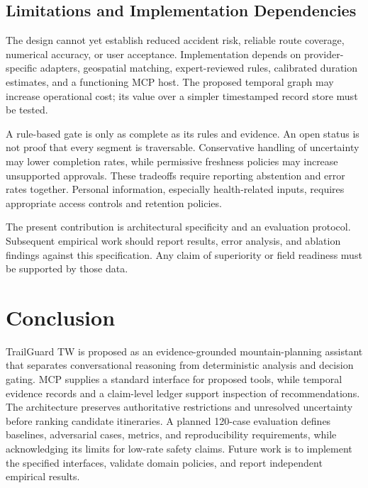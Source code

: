\documentclass[conference]{IEEEtran}
\begin{document}
\subsection{Limitations and Implementation Dependencies}
The design cannot yet establish reduced accident risk, reliable route coverage, numerical accuracy, or user acceptance. Implementation depends on provider-specific adapters, geospatial matching, expert-reviewed rules, calibrated duration estimates, and a functioning MCP host. The proposed temporal graph may increase operational cost; its value over a simpler timestamped record store must be tested.

A rule-based gate is only as complete as its rules and evidence. An open status is not proof that every segment is traversable. Conservative handling of uncertainty may lower completion rates, while permissive freshness policies may increase unsupported approvals. These tradeoffs require reporting abstention and error rates together. Personal information, especially health-related inputs, requires appropriate access controls and retention policies.

The present contribution is architectural specificity and an evaluation protocol. Subsequent empirical work should report results, error analysis, and ablation findings against this specification. Any claim of superiority or field readiness must be supported by those data.

\section{Conclusion}
TrailGuard TW is proposed as an evidence-grounded mountain-planning assistant that separates conversational reasoning from deterministic analysis and decision gating. MCP supplies a standard interface for proposed tools, while temporal evidence records and a claim-level ledger support inspection of recommendations. The architecture preserves authoritative restrictions and unresolved uncertainty before ranking candidate itineraries. A planned 120-case evaluation defines baselines, adversarial cases, metrics, and reproducibility requirements, while acknowledging its limits for low-rate safety claims. Future work is to implement the specified interfaces, validate domain policies, and report independent empirical results.
\end{document}
